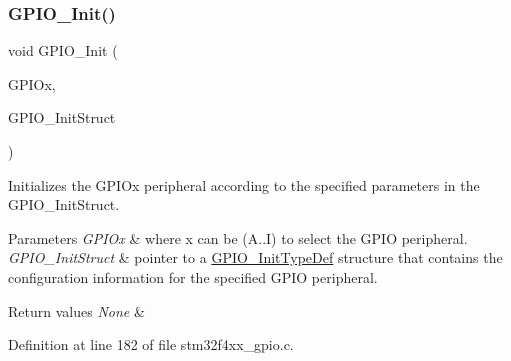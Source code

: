 \mbox{\label{group___g_p_i_o___group1_ga71abf9404261370d03cca449b88d3a65}} 
\subsubsection{\texorpdfstring{G\+P\+I\+O\+\_\+\+Init()}{GPIO\_Init()}}
{\footnotesize\ttfamily void G\+P\+I\+O\+\_\+\+Init (\begin{DoxyParamCaption}\item[{\hyperlink{struct_g_p_i_o___type_def}{G\+P\+I\+O\+\_\+\+Type\+Def} $\ast$}]{G\+P\+I\+Ox,  }\item[{\hyperlink{struct_g_p_i_o___init_type_def}{G\+P\+I\+O\+\_\+\+Init\+Type\+Def} $\ast$}]{G\+P\+I\+O\+\_\+\+Init\+Struct }\end{DoxyParamCaption})}



Initializes the G\+P\+I\+Ox peripheral according to the specified parameters in the G\+P\+I\+O\+\_\+\+Init\+Struct. 


\begin{DoxyParams}{Parameters}
{\em G\+P\+I\+Ox} & where x can be (A..I) to select the G\+P\+IO peripheral. \\
\hline
{\em G\+P\+I\+O\+\_\+\+Init\+Struct} & pointer to a \hyperlink{struct_g_p_i_o___init_type_def}{G\+P\+I\+O\+\_\+\+Init\+Type\+Def} structure that contains the configuration information for the specified G\+P\+IO peripheral. \\
\hline
\end{DoxyParams}

\begin{DoxyRetVals}{Return values}
{\em None} & \\
\hline
\end{DoxyRetVals}


Definition at line 182 of file stm32f4xx\+\_\+gpio.\+c.

\mbox{\label{group___g_p_i_o___group1_gad2f2e615928c69fd0d8c641a7cedaafc}} 

